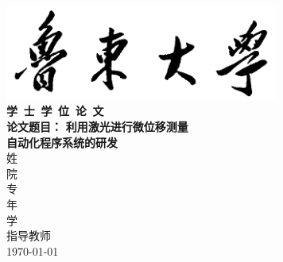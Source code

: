 \begin{titlepage}
  \vspace{2cm}
  \begin{center}
    \includegraphics[width=90mm]{image/ludong.png}\\
    {\songti\textbf{学\, 士\, 学\, 位\, 论\, 文}}\\
    \vspace{1.5cm}
    {\songti{}\textbf{论文题目：}}
    {\heiti{}\textbf{利用激光进行微位移测量\\
        \hspace{18.8mm}自动化程序系统的研发}}\\
    \vspace{6cm}
    {
    姓\underline{}\\[1em]
    院\underline{}\\[1em]
    专\underline{}\\[1em]
    年\underline{}\\[1em]
    学\underline{}\\[1em]
    指导教师   \underline{}\\
    }
    \vspace{2cm}
    \today
  \end{center}
\end{titlepage}


